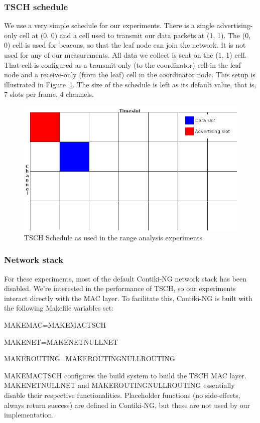 \documentclass[conference]{IEEEtran}
\newcommand{\figref}[1]{Figure~\ref{#1}}
\renewcommand\_{\textunderscore\allowbreak}
\begin{document}
\subsubsection{TSCH schedule}
\label{section:tschschedule}

We use a very simple schedule for our experiments. There is a single advertising-only cell at (0, 0) and a cell used to transmit our data packets at (1, 1). The (0, 0) cell is used for beacons, so that the leaf node can join the network. It is not used for any of our measurements. All data we collect is sent on the (1, 1) cell. That cell is configured as a transmit-only (to the coordinator) cell in the leaf node and a receive-only (from the leaf) cell in the coordinator node. This setup is illustrated in \figref{fig:TSCHSchedule}. The size of the schedule is left as its default value, that is, 7 slots per frame, 4 channels.

\begin{figure}[htbp]
	\centering
	\includegraphics[width=.48\textwidth,keepaspectratio]{figures/tsch_schedule.png}
	\caption{TSCH Schedule as used in the range analysis experiments}
	\label{fig:TSCHSchedule}
\end{figure}

\subsubsection{Network stack}
\label{section:netstack}

For these experiments, most of the default Contiki-NG network stack has been disabled. We're interested in the performance of TSCH, so our experiments interact directly with the MAC layer. To facilitate this, Contiki-NG is built with the following Makefile variables set: 
\begin{itemize}
{
\small
\item MAKE\_MAC=MAKE\_MAC\_TSCH
\item MAKE\_NET=MAKE\_NET\_NULLNET
\item MAKE\_ROUTING=MAKE\_ROUTING\_NULLROUTING
}
\end{itemize}

MAKE\_MAC\_TSCH configures the build system to build the TSCH MAC layer. MAKE\_NET\_NULLNET and MAKE\_ROUTING\_NULLROUTING essentially disable their respective functionalities. Placeholder functions (no side-effects, always return success) are defined in Contiki-NG, but these are not used by our implementation. 
\end{document}
